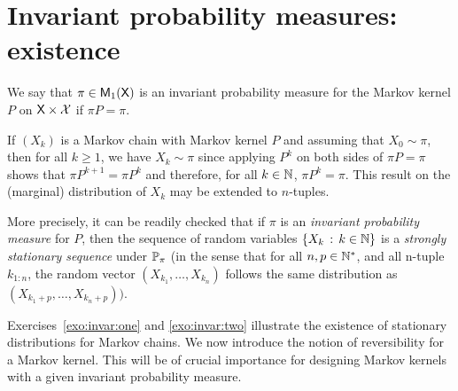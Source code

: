 \documentclass[english,graybox,envcountchap,envcountsame,sectrefs,shortlabels]{svmono}
\theoremstyle{style}
\begin{document}
\section{Invariant probability measures: existence}
\begin{framed}%
\begin{definition}
We say that $\pi\in\mathsf{M}_{1}(\mathsf{X})$ is an invariant probability measure
for the Markov kernel $P$ on $\mathsf{X}\times\mathcal{X}$ if $\pi P=\pi$.
\end{definition}
\end{framed}

If $(X_{k})$ is a Markov chain with Markov kernel $P$
and assuming that $X_{0}\sim\pi$, then for all $k\geq1$, we have
$X_{k}\sim\pi$ since applying $P^{k}$ on
both sides of $\pi P=\pi$ shows that $\pi P^{k+1}=\pi P^{k}$ and
therefore, for all $k\in\mathbb{N}$, $\pi P^{k}=\pi$. This result on
the (marginal) distribution of $X_{k}$ may be extended to $n$-tuples.

More precisely, it can be readily checked that if $\pi$ is an \emph{invariant
probability measure }for $P$, then the sequence of random variables
$\left\{ X_{k}\,:\,k\in\mathbb{N}\right\}$ is a \emph{strongly stationary sequence}
under $\mathbb{P}_{\pi}$ (in the sense that for all $n,p\in\mathbb{N}^{*}$,
and all n-tuple $k_{1:n}$, the random vector $(X_{k_{1}},\ldots,X_{k_{n}})$
follows the same distribution as $(X_{k_{1}+p},\ldots,X_{k_{n}+p}))$.

Exercises~\ref{exo:invar:one} and \ref{exo:invar:two} illustrate the existence of stationary distributions for Markov chains.
We now introduce the notion of reversibility for a Markov kernel.
This will be of crucial importance for designing Markov kernels with
a given invariant probability measure.
\end{document}

